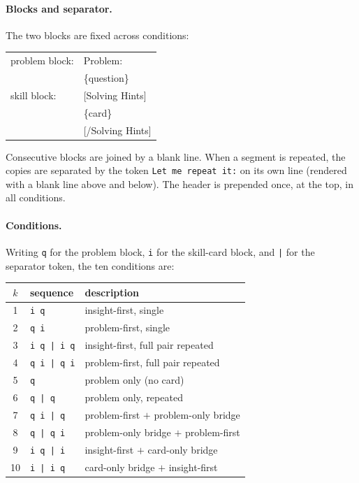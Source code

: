 \paragraph{Blocks and separator.}
The two blocks are fixed across conditions:
%
\begin{center}
\ttfamily\small
\begin{tabular}{@{}ll@{}}
problem block: & Problem:\\
               & \{question\}\\[4pt]
skill block:   & [Solving Hints]\\
               & \{card\}\\
               & [/Solving Hints]\\
\end{tabular}
\end{center}
%
Consecutive blocks are joined by a blank line. When a segment is repeated, the
copies are separated by the token \texttt{Let me repeat it:} on its own line
(rendered with a blank line above and below). The header is prepended once, at
the top, in all conditions.

\paragraph{Conditions.}
Writing \texttt{q} for the problem block, \texttt{i} for the skill-card block,
and \texttt{|} for the separator token, the ten conditions are:
%
\begin{center}
\small
\begin{tabular}{@{}cll@{}}
\toprule
$k$ & sequence & description \\
\midrule
1  & \texttt{i\ q}          & insight-first, single \\
2  & \texttt{q\ i}          & problem-first, single \\
3  & \texttt{i\ q\ |\ i\ q} & insight-first, full pair repeated \\
4  & \texttt{q\ i\ |\ q\ i} & problem-first, full pair repeated \\
5  & \texttt{q}             & problem only (no card) \\
6  & \texttt{q\ |\ q}       & problem only, repeated \\
7  & \texttt{q\ i\ |\ q}    & problem-first $+$ problem-only bridge \\
8  & \texttt{q\ |\ q\ i}    & problem-only bridge $+$ problem-first \\
9  & \texttt{i\ q\ |\ i}    & insight-first $+$ card-only bridge \\
10 & \texttt{i\ |\ i\ q}    & card-only bridge $+$ insight-first \\
\bottomrule
\end{tabular}
\end{center}

